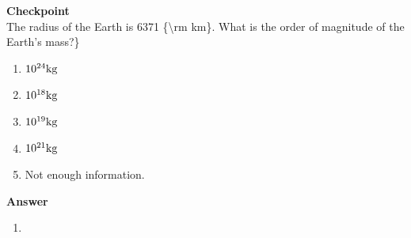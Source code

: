 \begin{framed}
\textbf{Checkpoint}\\
The radius of the Earth is 6371 \{{\textbackslash}rm km\}. What is the order of magnitude of the Earth's mass?\}

\begin{enumerate}
\item $10^{24} {\rm kg}$
\item $10^{18} {\rm kg}$
\item $10^{19} {\rm kg}$
\item $10^{21} {\rm kg}$
\item Not enough information.
\end{enumerate}

\begin{framed}
\textbf{Answer}\\
\begin{enumerate}
\item
\end{enumerate}
\end{framed}
\end{framed}

